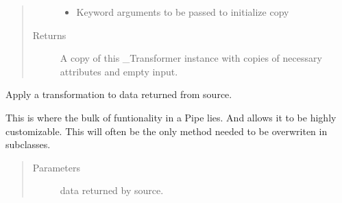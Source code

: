 \documentclass[letterpaper,10pt,english]{sphinxmanual}
\begin{document}
\begin{fulllineitems}
\begin{fulllineitems}
\begin{quote}
\begin{description}
\begin{itemize}
\item {} 
 \textendash{} Keyword arguments to be passed to initialize copy

\end{itemize}

\item[{Returns}] \leavevmode
A copy of this \_Transformer instance with copies of necessary
attributes and empty input.

\end{description}\end{quote}

\end{fulllineitems}


\begin{fulllineitems}
\label{\detokenize{dalio.pipe:dalio.pipe.select.ColReorder.transform}}
Apply a transformation to data returned from source.

This is where the bulk of funtionality in a Pipe lies. And allows it
to be highly customizable. This will often be the only method needed
to be overwriten in subclasses.
\begin{quote}\begin{description}
\item[{Parameters}] \leavevmode
{} \textendash{} data returned by source.

\end{description}\end{quote}

\end{fulllineitems}


\end{fulllineitems}

\end{document}
